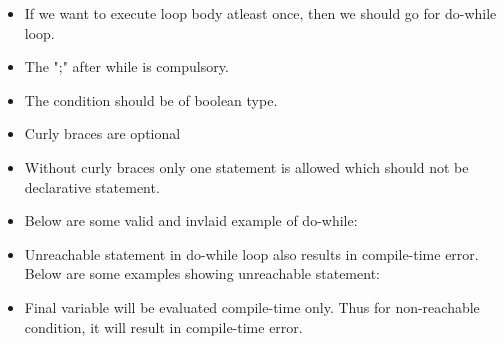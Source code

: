 \setlength{\columnsep}{3pt}
\begin{flushleft}
	
	\begin{itemize}
		\item If we want to execute loop body atleast once, then we should go for do-while loop.
		\bigskip
		\bigskip
		\item The ";" after while is compulsory.
		\item The condition should be of boolean type.
		\item Curly braces are optional
		\item Without curly braces only one statement is allowed which should not be declarative statement.
		\item Below are some valid and invlaid example of do-while:
		\bigskip
		\bigskip
		\bigskip
		\bigskip
		\bigskip
		\item Unreachable statement in do-while loop also results in compile-time error. Below are some examples showing unreachable statement:
		\bigskip
		\bigskip
		\item Final variable will be evaluated compile-time only. Thus for non-reachable condition, it will result in compile-time error.
		
		\bigskip
	
	\end{itemize}		
	
\end{flushleft}

\newpage

